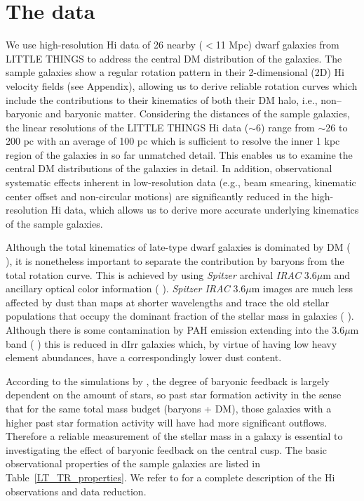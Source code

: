 \documentclass[natbib209]{emulateapj}
\begin{document}
\section{The data} \label{DATA}
We use high-resolution H{\sc i} data of 26 nearby ($<$11 Mpc) dwarf galaxies
from LITTLE THINGS to address the central DM distribution of the galaxies. The
sample galaxies show a regular rotation pattern in their 2-dimensional (2D) H{\sc i} velocity
fields (see Appendix), allowing us to derive reliable rotation curves
which include the contributions to their kinematics of both their DM halo, i.e.,
non--baryonic and baryonic matter.
Considering the distances of the sample galaxies, the linear
resolutions of the LITTLE THINGS H{\sc i} data ($\sim$6\arcsec) range from $\sim$26 to 200 pc with an
average of 100 pc which is sufficient to resolve the inner 1 kpc region of the
galaxies in so far unmatched detail. This enables us to examine the central DM 
distributions of the galaxies in detail. In addition, observational systematic
effects inherent in low-resolution data (e.g., beam smearing, kinematic center
offset and non-circular motions) are significantly reduced in the
high-resolution H{\sc i} data, which allows us to derive more accurate underlying
kinematics of the sample galaxies. 

Although the total kinematics of late-type dwarf galaxies is dominated by DM
 (\citeauthor{Prada_2002} \citeyear{Prada_2002}), it is nonetheless important to separate the contribution
by baryons from the total rotation curve. This is achieved by using {\it Spitzer} archival {\it IRAC} 3.6$\mu$m and
ancillary optical color information (\citeauthor{Hunter_2006}
\citeyear{Hunter_2006}). {\it Spitzer IRAC} 3.6$\mu$m images are much less affected by dust than maps
at shorter wavelengths and trace the old stellar populations that occupy the dominant fraction of
the stellar mass in galaxies (\citeauthor{Walter_2007} \citeyear{Walter_2007}). Although there is some
contamination by PAH emission extending into the 3.6$\mu$m band (\citeauthor{2014ApJ...788..144M} \citeyear{2014ApJ...788..144M}) 
this is reduced in dIrr galaxies which, by virtue of having low heavy element abundances, have a correspondingly
lower dust content.

According to the simulations by
\cite{Governato_2012}, the degree of baryonic feedback is largely dependent on
the amount of stars, so past star formation activity in the sense that for the
same total mass budget (baryons + DM), those galaxies with a higher past star
formation activity will have had more significant outflows.
Therefore a reliable measurement of the
stellar mass in a galaxy is essential to investigating
the effect of baryonic feedback on the central cusp. The basic observational
properties of the sample galaxies are listed in Table~\ref{LT_TR_properties}.
We refer to \cite{Hunter_2012} for a complete description of the H{\sc i} observations
and data reduction. 
\end{document}

